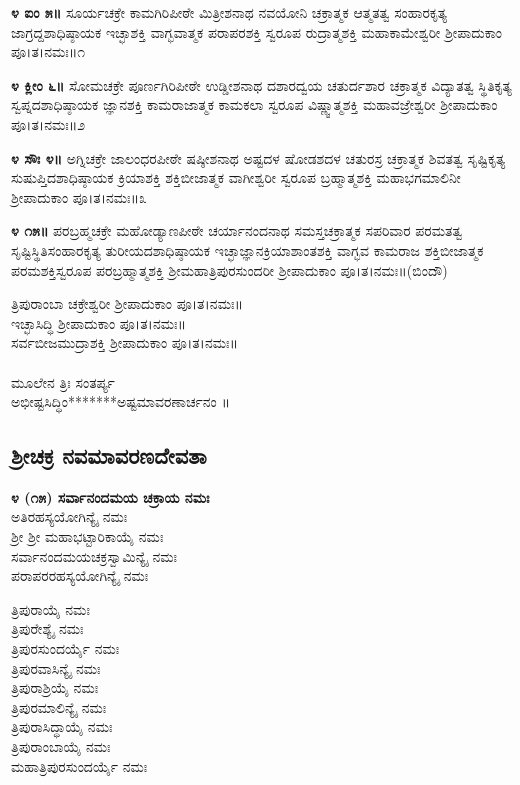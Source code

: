 {\bfseries ೪ ಐಂ ೫॥} ಸೂರ್ಯಚಕ್ರೇ ಕಾಮಗಿರಿಪೀಠೇ ಮಿತ್ರೀಶನಾಥ ನವಯೋನಿ ಚಕ್ರಾತ್ಮಕ ಆತ್ಮತತ್ವ ಸಂಹಾರಕೃತ್ಯ ಜಾಗ್ರದ್ದಶಾಧಿಷ್ಠಾಯಕ ಇಚ್ಛಾಶಕ್ತಿ ವಾಗ್ಭವಾತ್ಮಕ ಪರಾಪರಶಕ್ತಿ ಸ್ವರೂಪ ರುದ್ರಾತ್ಮಶಕ್ತಿ ಮಹಾಕಾಮೇಶ್ವರೀ ಶ್ರೀಪಾದುಕಾಂ ಪೂ।ತ।ನಮಃ॥೧

{\bfseries೪ ಕ್ಲೀಂ ೬॥} ಸೋಮಚಕ್ರೇ ಪೂರ್ಣಗಿರಿಪೀಠೇ ಉಡ್ಡೀಶನಾಥ  ದಶಾರದ್ವಯ ಚತುರ್ದಶಾರ ಚಕ್ರಾತ್ಮಕ ವಿದ್ಯಾತತ್ವ ಸ್ಥಿತಿಕೃತ್ಯ ಸ್ವಪ್ನದಶಾಧಿಷ್ಠಾಯಕ ಜ್ಞಾನಶಕ್ತಿ ಕಾಮರಾಜಾತ್ಮಕ ಕಾಮಕಲಾ ಸ್ವರೂಪ ವಿಷ್ಣ್ವಾತ್ಮಶಕ್ತಿ ಮಹಾವಜ್ರೇಶ್ವರೀ ಶ್ರೀಪಾದುಕಾಂ ಪೂ।ತ।ನಮಃ॥೨

{\bfseries೪ ಸೌಃ ೪॥} ಅಗ್ನಿಚಕ್ರೇ ಜಾಲಂಧರಪೀಠೇ  ಷಷ್ಠೀಶನಾಥ ಅಷ್ಟದಳ ಷೋಡಶದಳ ಚತುರಸ್ರ ಚಕ್ರಾತ್ಮಕ ಶಿವತತ್ವ ಸೃಷ್ಟಿಕೃತ್ಯ ಸುಷುಪ್ತಿದಶಾಧಿಷ್ಠಾಯಕ ಕ್ರಿಯಾಶಕ್ತಿ ಶಕ್ತಿಬೀಜಾತ್ಮಕ ವಾಗೀಶ್ವರೀ ಸ್ವರೂಪ ಬ್ರಹ್ಮಾತ್ಮಶಕ್ತಿ  ಮಹಾಭಗಮಾಲಿನೀ ಶ್ರೀಪಾದುಕಾಂ ಪೂ।ತ।ನಮಃ॥೩

{\bfseries೪ ೧೫॥} ಪರಬ್ರಹ್ಮಚಕ್ರೇ ಮಹೋಡ್ಯಾಣಪೀಠೇ ಚರ್ಯಾನಂದನಾಥ ಸಮಸ್ತಚಕ್ರಾತ್ಮಕ ಸಪರಿವಾರ ಪರಮತತ್ವ ಸೃಷ್ಟಿಸ್ಥಿತಿಸಂಹಾರಕೃತ್ಯ ತುರೀಯದಶಾಧಿಷ್ಠಾಯಕ ಇಚ್ಛಾಜ್ಞಾನಕ್ರಿಯಾಶಾಂತಶಕ್ತಿ ವಾಗ್ಭವ ಕಾಮರಾಜ ಶಕ್ತಿಬೀಜಾತ್ಮಕ ಪರಮಶಕ್ತಿಸ್ವರೂಪ ಪರಬ್ರಹ್ಮಾತ್ಮಶಕ್ತಿ ಶ್ರೀಮಹಾತ್ರಿಪುರಸುಂದರೀ ಶ್ರೀಪಾದುಕಾಂ ಪೂ।ತ।ನಮಃ॥(ಬಿಂದೌ)

 ತ್ರಿಪುರಾಂಬಾ ಚಕ್ರೇಶ್ವರೀ ಶ್ರೀಪಾದುಕಾಂ ಪೂ।ತ।ನಮಃ॥\\
 ಇಚ್ಛಾಸಿದ್ಧಿ ಶ್ರೀಪಾದುಕಾಂ ಪೂ।ತ।ನಮಃ॥\\
 ಸರ್ವಬೀಜಮುದ್ರಾಶಕ್ತಿ ಶ್ರೀಪಾದುಕಾಂ ಪೂ।ತ।ನಮಃ॥\\
\\
ಮೂಲೇನ ತ್ರಿಃ ಸಂತರ್ಪ್ಯ\\
 ಅಭೀಷ್ಟಸಿದ್ಧಿಂ*******ಅಷ್ಟಮಾವರಣಾರ್ಚನಂ ॥
\subsection{ಶ್ರೀಚಕ್ರ ನವಮಾವರಣದೇವತಾ}
{\bfseries ೪ (೧೫) ಸರ್ವಾನಂದಮಯ ಚಕ್ರಾಯ ನಮಃ}\\
ಅತಿರಹಸ್ಯಯೋಗಿನ್ಯೈ ನಮಃ\\
 ಶ್ರೀ ಶ್ರೀ ಮಹಾಭಟ್ಟಾರಿಕಾಯೈ ನಮಃ\\
 ಸರ್ವಾನಂದಮಯಚಕ್ರಸ್ವಾಮಿನ್ಯೈ ನಮಃ\\
ಪರಾಪರರಹಸ್ಯಯೋಗಿನ್ಯೈ ನಮಃ

 ತ್ರಿಪುರಾಯೈ ನಮಃ\\
 ತ್ರಿಪುರೇಶ್ಯೈ ನಮಃ\\
 ತ್ರಿಪುರಸುಂದರ್ಯೈ ನಮಃ\\
 ತ್ರಿಪುರವಾಸಿನ್ಯೈ ನಮಃ\\
 ತ್ರಿಪುರಾಶ್ರಿಯೈ ನಮಃ\\
 ತ್ರಿಪುರಮಾಲಿನ್ಯೈ ನಮಃ\\
 ತ್ರಿಪುರಾಸಿದ್ಧಾಯೈ ನಮಃ\\
 ತ್ರಿಪುರಾಂಬಾಯೈ ನಮಃ\\
 ಮಹಾತ್ರಿಪುರಸುಂದರ್ಯೈ ನಮಃ

